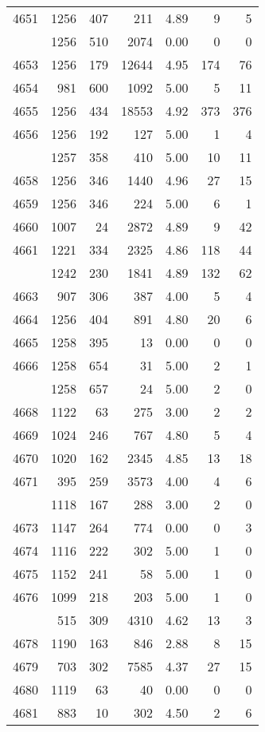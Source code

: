 \documentclass[
]{article}
\begin{document}
\begin{table}
\begin{tabular}[t]{lrrrrrr}
4651 & 1256 & 407 & 211 & 4.89 & 9 & 5\\
\addlinespace
4652 & 1256 & 510 & 2074 & 0.00 & 0 & 0\\
4653 & 1256 & 179 & 12644 & 4.95 & 174 & 76\\
4654 & 981 & 600 & 1092 & 5.00 & 5 & 11\\
4655 & 1256 & 434 & 18553 & 4.92 & 373 & 376\\
4656 & 1256 & 192 & 127 & 5.00 & 1 & 4\\
\addlinespace
4657 & 1257 & 358 & 410 & 5.00 & 10 & 11\\
4658 & 1256 & 346 & 1440 & 4.96 & 27 & 15\\
4659 & 1256 & 346 & 224 & 5.00 & 6 & 1\\
4660 & 1007 & 24 & 2872 & 4.89 & 9 & 42\\
4661 & 1221 & 334 & 2325 & 4.86 & 118 & 44\\
\addlinespace
4662 & 1242 & 230 & 1841 & 4.89 & 132 & 62\\
4663 & 907 & 306 & 387 & 4.00 & 5 & 4\\
4664 & 1256 & 404 & 891 & 4.80 & 20 & 6\\
4665 & 1258 & 395 & 13 & 0.00 & 0 & 0\\
4666 & 1258 & 654 & 31 & 5.00 & 2 & 1\\
\addlinespace
4667 & 1258 & 657 & 24 & 5.00 & 2 & 0\\
4668 & 1122 & 63 & 275 & 3.00 & 2 & 2\\
4669 & 1024 & 246 & 767 & 4.80 & 5 & 4\\
4670 & 1020 & 162 & 2345 & 4.85 & 13 & 18\\
4671 & 395 & 259 & 3573 & 4.00 & 4 & 6\\
\addlinespace
4672 & 1118 & 167 & 288 & 3.00 & 2 & 0\\
4673 & 1147 & 264 & 774 & 0.00 & 0 & 3\\
4674 & 1116 & 222 & 302 & 5.00 & 1 & 0\\
4675 & 1152 & 241 & 58 & 5.00 & 1 & 0\\
4676 & 1099 & 218 & 203 & 5.00 & 1 & 0\\
\addlinespace
4677 & 515 & 309 & 4310 & 4.62 & 13 & 3\\
4678 & 1190 & 163 & 846 & 2.88 & 8 & 15\\
4679 & 703 & 302 & 7585 & 4.37 & 27 & 15\\
4680 & 1119 & 63 & 40 & 0.00 & 0 & 0\\
4681 & 883 & 10 & 302 & 4.50 & 2 & 6\\

\end{tabular}
\end{table}
\end{document}
